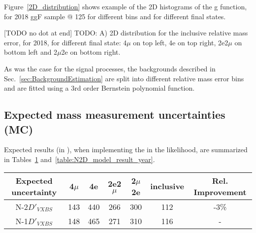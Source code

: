 Figure~\ref{2D_distribution} shows example of the 2D histograms of the g function, for 2018 ggF sample @ 125 \GeV
for different bins and for different final states.
\begin{multiFigure}
	\centering
		[TODO no dot at end]
		{TODO:
		\;A) 
		2D distribution for the inclusive relative mass error, for 2018, for different final state:
		4$\mu$ on top left, 4e on top right, 2e2$\mu$ on bottom left and 2$\mu$2e on bottom right.}
	\label{2D_distribution}
\end{multiFigure}

As was the case for the signal processes, the backgrounds described in Sec.~\ref{sec:BackgroundEstimation} are split into different relative mass error bins and are fitted using a 3rd order Bernstein polynomial function.

\subsection{Expected mass measurement uncertainties (MC)}
Expected results (in \MeV), when implementing the \Dkinbkg in the likelihood, 
are summarized in Tables~\ref{table:N2D_model_result} and~\ref{table:N2D_model_result_year}.
\begin{table}[ht]	
\begin{center}
	\begin{tabular}{ccccccc}
	\hline			
	Expected uncertainty	&	4$\mu$	&	4e	&	2e2$\mu$	&2$\mu$2e	& inclusive	&	 Rel. Improvement \\
	\hline			
	N-2$D'_{VXBS}$	&	143	&	440	&	266	&	300	&	112	&	-3\%	\\
	N-1$D'_{VXBS}$	&	148	&	465	&	271	&	310	&	116	&	-	\\
	\hline
	\end{tabular}
	\label{table:N2D_model_result} 
\end{center}
\end{table}

